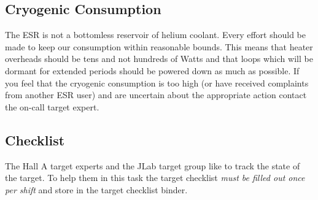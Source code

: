 {\subsection{Cryogenic Consumption}

The ESR is not a bottomless reservoir of helium coolant. Every effort should
be made to keep our consumption within reasonable bounds. This means that heater
overheads should be tens and not hundreds of Watts and that loops which will
be dormant for extended periods should be powered down as much as possible.
If you feel that the cryogenic consumption is too high (or have received complaints
from another ESR user) and are uncertain about the appropriate action contact
the on-call target expert.


\subsection{Checklist}

The Hall A target experts and the JLab target group like to track the state
of the target. To help them in this task the 
target checklist \emph{must be filled
out once per shift} and store in the target checklist binder.

}
